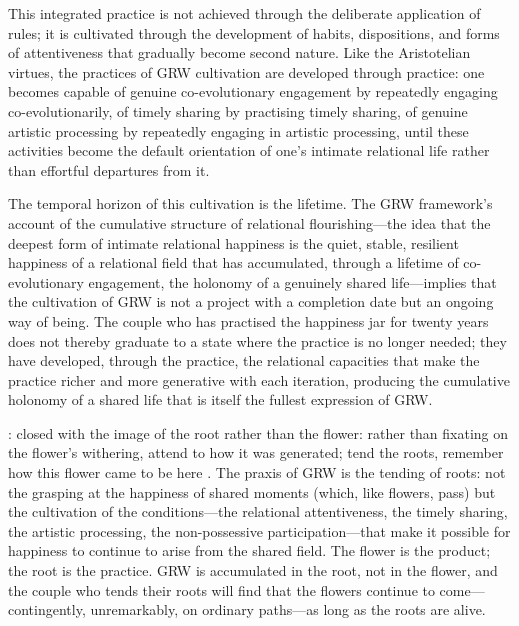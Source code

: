 This integrated practice is not achieved through the deliberate application of rules; it is cultivated through the development of habits, dispositions, and forms of attentiveness that gradually become second nature. Like the Aristotelian virtues, the practices of GRW cultivation are developed through practice: one becomes capable of genuine co-evolutionary engagement by repeatedly engaging co-evolutionarily, of timely sharing by practising timely sharing, of genuine artistic processing by repeatedly engaging in artistic processing, until these activities become the default orientation of one's intimate relational life rather than effortful departures from it.

The temporal horizon of this cultivation is the lifetime. The GRW framework's account of the cumulative structure of relational flourishing---the idea that the deepest form of intimate relational happiness is the quiet, stable, resilient happiness of a relational field that has accumulated, through a lifetime of co-evolutionary engagement, the holonomy of a genuinely shared life---implies that the cultivation of GRW is not a project with a completion date but an ongoing way of being. The couple who has practised the happiness jar for twenty years does not thereby graduate to a state where the practice is no longer needed; they have developed, through the practice, the relational capacities that make the practice richer and more generative with each iteration, producing the cumulative holonomy of a shared life that is itself the fullest expression of GRW.

:  closed with the image of the root rather than the flower: rather than fixating on the flower's withering, attend to how it was generated; tend the roots, remember how this flower came to be here \parencite{paperix}. The praxis of GRW is the tending of roots: not the grasping at the happiness of shared moments (which, like flowers, pass) but the cultivation of the conditions---the relational attentiveness, the timely sharing, the artistic processing, the non-possessive participation---that make it possible for happiness to continue to arise from the shared field. The flower is the product; the root is the practice. GRW is accumulated in the root, not in the flower, and the couple who tends their roots will find that the flowers continue to come---contingently, unremarkably, on ordinary paths---as long as the roots are alive.
